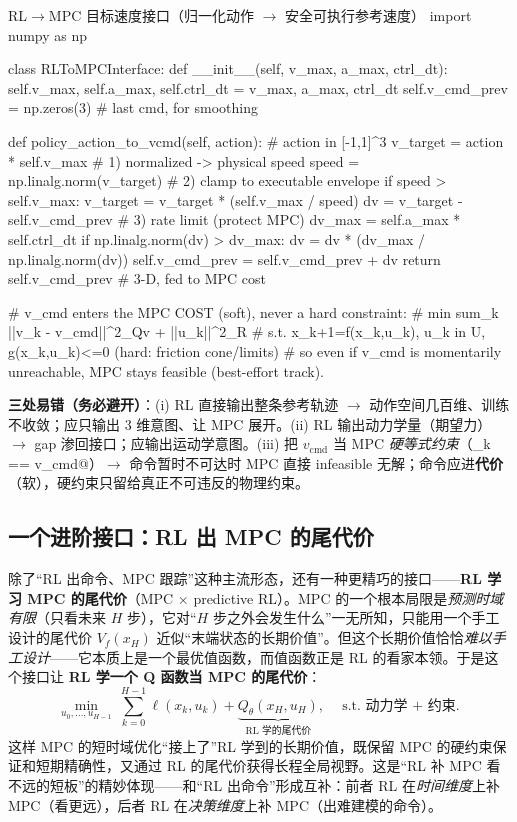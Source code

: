 \begin{codebox}[Python]{RL$\to$MPC 目标速度接口（归一化动作 $\to$ 安全可执行参考速度）}
import numpy as np

class RLToMPCInterface:
    def __init__(self, v_max, a_max, ctrl_dt):
        self.v_max, self.a_max, self.ctrl_dt = v_max, a_max, ctrl_dt
        self.v_cmd_prev = np.zeros(3)              # last cmd, for smoothing

    def policy_action_to_vcmd(self, action):       # action in [-1,1]^3
        v_target = action * self.v_max             # 1) normalized -> physical speed
        speed = np.linalg.norm(v_target)           # 2) clamp to executable envelope
        if speed > self.v_max:
            v_target = v_target * (self.v_max / speed)
        dv = v_target - self.v_cmd_prev            # 3) rate limit (protect MPC)
        dv_max = self.a_max * self.ctrl_dt
        if np.linalg.norm(dv) > dv_max:
            dv = dv * (dv_max / np.linalg.norm(dv))
        self.v_cmd_prev = self.v_cmd_prev + dv
        return self.v_cmd_prev                      # 3-D, fed to MPC cost

# v_cmd enters the MPC COST (soft), never a hard constraint:
#   min  sum_k ||v_k - v_cmd||^2_{Qv} + ||u_k||^2_R
#   s.t. x_{k+1}=f(x_k,u_k),  u_k in U,  g(x_k,u_k)<=0   (hard: friction cone/limits)
# so even if v_cmd is momentarily unreachable, MPC stays feasible (best-effort track).
\end{codebox}

\noindent\textbf{三处易错（务必避开）}：(i) RL 直接输出整条参考轨迹 $\to$ 动作空间几百维、训练不收敛；应只输出 $3$ 维意图、让 MPC 展开。(ii) RL 输出动力学量（期望力）$\to$ gap 渗回接口；应输出运动学意图。(iii) 把 $v_{\text{cmd}}$ 当 MPC \emph{硬等式约束}（\verb@v_k == v_cmd@）$\to$ 命令暂时不可达时 MPC 直接 infeasible 无解；命令应进\textbf{代价}（软），硬约束只留给真正不可违反的物理约束。

\subsection{一个进阶接口：RL 出 MPC 的尾代价}
\label{sec:mh-terminal-cost}

除了“RL 出命令、MPC 跟踪”这种主流形态，还有一种更精巧的接口——\textbf{RL 学习 MPC 的尾代价}（MPC $\times$ predictive RL\cite{kovalev2023mpcrl}）。MPC 的一个根本局限是\emph{预测时域有限}（只看未来 $H$ 步），它对“$H$ 步之外会发生什么”一无所知，只能用一个手工设计的尾代价 $V_f(x_H)$ 近似“末端状态的长期价值”。但这个长期价值恰恰\emph{难以手工设计}——它本质上是一个最优值函数，而值函数正是 RL 的看家本领。于是这个接口让 \textbf{RL 学一个 Q 函数当 MPC 的尾代价}：
\begin{equation}
  \min_{u_0,\dots,u_{H-1}}\ \sum_{k=0}^{H-1}\ell(x_k,u_k)+\underbrace{Q_\theta(x_H,u_H)}_{\text{RL 学的尾代价}},\quad\text{s.t. 动力学 $+$ 约束.}
  \label{eq:mh-terminal-q}
\end{equation}
这样 MPC 的短时域优化“接上了”RL 学到的长期价值，既保留 MPC 的硬约束保证和短期精确性，又通过 RL 的尾代价获得长程全局视野。这是“RL 补 MPC 看不远的短板”的精妙体现——和“RL 出命令”形成互补：前者 RL 在\emph{时间维度}上补 MPC（看更远），后者 RL 在\emph{决策维度}上补 MPC（出难建模的命令）。

